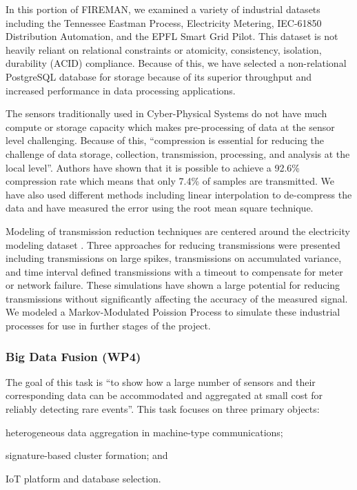 In this portion of FIREMAN, we examined a  variety of industrial datasets including the Tennessee Eastman Process, Electricity Metering, IEC-61850 Distribution Automation, and the EPFL Smart Grid Pilot.
This dataset is not heavily reliant on relational constraints or atomicity, consistency, isolation, durability (ACID) compliance.
Because of this, we have selected a non-relational PostgreSQL database for storage because of its superior throughput and increased performance in data processing applications.

The sensors traditionally used in Cyber-Physical Systems do not have much compute or storage capacity which makes pre-processing of data at the sensor level challenging.
Because of this, \enquote{compression is essential for reducing the challenge of data storage, collection, transmission, processing, and analysis at the local level}\parencite{compression}.
Authors \cite{wp3.2} have shown that it is possible to achieve a 92.6\% compression rate which means that only 7.4\% of samples are transmitted.
We have also used different methods including linear interpolation to de-compress the data and have measured the error using the root mean square technique.

Modeling of transmission reduction techniques are centered around the electricity modeling dataset \parencite{elect-model-dataset-9694611}.
Three approaches for reducing transmissions were presented including transmissions on large spikes, transmissions on accumulated variance, and time interval defined transmissions with a timeout to compensate for meter or network failure.
These simulations have shown a large potential for reducing transmissions without significantly affecting the accuracy of the measured signal.
We modeled a Markov-Modulated Poission Process to simulate these industrial processes for use in further stages of the project.

\subsubsection{Big Data Fusion (WP4)}
\label{ref_wp4}
The goal of this task is \enquote{to show how a large number of sensors and their corresponding data can be  accommodated and aggregated at small cost for reliably detecting rare events}\parencite{wp4.1}.
This task focuses on three primary objects:
\begin{inlinelist}
    \item heterogeneous data aggregation in machine-type communications;
    \item signature-based cluster formation; and
    \item IoT platform and database selection.
\end{inlinelist}

